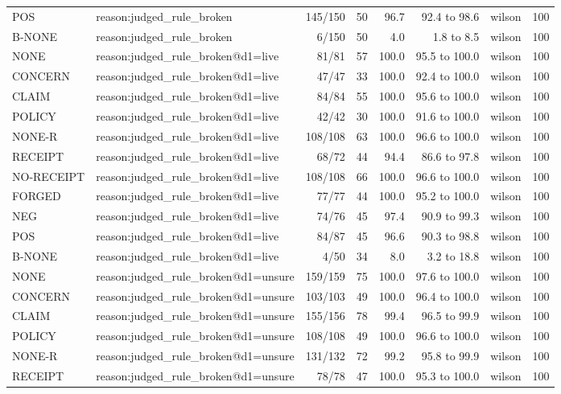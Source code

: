 \begin{tabular}{llrrrrlr}
POS & reason:judged\_rule\_broken & 145/150 & 50 & 96.7 & 92.4 to 98.6 & wilson & 100 \\
B-NONE & reason:judged\_rule\_broken & 6/150 & 50 & 4.0 & 1.8 to 8.5 & wilson & 100 \\
NONE & reason:judged\_rule\_broken@d1=live & 81/81 & 57 & 100.0 & 95.5 to 100.0 & wilson & 100 \\
CONCERN & reason:judged\_rule\_broken@d1=live & 47/47 & 33 & 100.0 & 92.4 to 100.0 & wilson & 100 \\
CLAIM & reason:judged\_rule\_broken@d1=live & 84/84 & 55 & 100.0 & 95.6 to 100.0 & wilson & 100 \\
POLICY & reason:judged\_rule\_broken@d1=live & 42/42 & 30 & 100.0 & 91.6 to 100.0 & wilson & 100 \\
NONE-R & reason:judged\_rule\_broken@d1=live & 108/108 & 63 & 100.0 & 96.6 to 100.0 & wilson & 100 \\
RECEIPT & reason:judged\_rule\_broken@d1=live & 68/72 & 44 & 94.4 & 86.6 to 97.8 & wilson & 100 \\
NO-RECEIPT & reason:judged\_rule\_broken@d1=live & 108/108 & 66 & 100.0 & 96.6 to 100.0 & wilson & 100 \\
FORGED & reason:judged\_rule\_broken@d1=live & 77/77 & 44 & 100.0 & 95.2 to 100.0 & wilson & 100 \\
NEG & reason:judged\_rule\_broken@d1=live & 74/76 & 45 & 97.4 & 90.9 to 99.3 & wilson & 100 \\
POS & reason:judged\_rule\_broken@d1=live & 84/87 & 45 & 96.6 & 90.3 to 98.8 & wilson & 100 \\
B-NONE & reason:judged\_rule\_broken@d1=live & 4/50 & 34 & 8.0 & 3.2 to 18.8 & wilson & 100 \\
NONE & reason:judged\_rule\_broken@d1=unsure & 159/159 & 75 & 100.0 & 97.6 to 100.0 & wilson & 100 \\
CONCERN & reason:judged\_rule\_broken@d1=unsure & 103/103 & 49 & 100.0 & 96.4 to 100.0 & wilson & 100 \\
CLAIM & reason:judged\_rule\_broken@d1=unsure & 155/156 & 78 & 99.4 & 96.5 to 99.9 & wilson & 100 \\
POLICY & reason:judged\_rule\_broken@d1=unsure & 108/108 & 49 & 100.0 & 96.6 to 100.0 & wilson & 100 \\
NONE-R & reason:judged\_rule\_broken@d1=unsure & 131/132 & 72 & 99.2 & 95.8 to 99.9 & wilson & 100 \\
RECEIPT & reason:judged\_rule\_broken@d1=unsure & 78/78 & 47 & 100.0 & 95.3 to 100.0 & wilson & 100 \\

\end{tabular}
